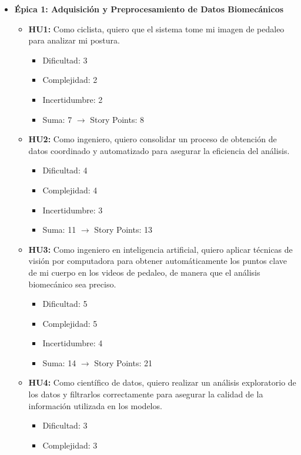 \documentclass[
11pt, %
]{charter}
\begin{document}
\begin{itemize}
  \item \textbf{Épica 1: Adquisición y Preprocesamiento de Datos Biomecánicos}
    \begin{itemize}
      \item \textbf{HU1:} Como ciclista, quiero que el sistema tome mi imagen de pedaleo para analizar mi postura.
        \begin{itemize}
          \item Dificultad: 3
          \item Complejidad: 2
          \item Incertidumbre: 2
          \item Suma: 7 $\rightarrow$ Story Points: 8
        \end{itemize}
      \item \textbf{HU2:} Como ingeniero, quiero consolidar un proceso de obtención de datos coordinado y automatizado para asegurar la eficiencia del análisis.
        \begin{itemize}
          \item Dificultad: 4
          \item Complejidad: 4
          \item Incertidumbre: 3
          \item Suma: 11 $\rightarrow$ Story Points: 13
        \end{itemize}
      \item \textbf{HU3:} Como ingeniero en inteligencia artificial, quiero aplicar técnicas de visión por computadora para obtener automáticamente los puntos clave de mi cuerpo en los videos de pedaleo, de manera que el análisis biomecánico sea preciso.
        \begin{itemize}
          \item Dificultad: 5
          \item Complejidad: 5
          \item Incertidumbre: 4
          \item Suma: 14 $\rightarrow$ Story Points: 21
        \end{itemize}
      \item \textbf{HU4:} Como científico de datos, quiero realizar un análisis exploratorio de los datos y filtrarlos correctamente para asegurar la calidad de la información utilizada en los modelos.
        \begin{itemize}
          \item Dificultad: 3
          \item Complejidad: 3

\end{itemize}
\end{itemize}
\end{itemize}
\end{document}
